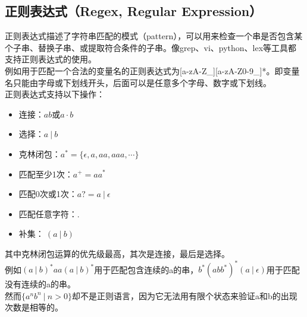 \vspace{0.5cm}

\subsection{正则表达式（Regex, Regular Expression）}

正则表达式描述了字符串匹配的模式（pattern），可以用来检查一个串是否包含某个子串、替换子串、或提取符合条件的子串。像grep、vi、python、lex等工具都支持正则表达式的使用。\\

例如用于匹配一个合法的变量名的正则表达式为[a-zA-Z\_][a-zA-Z0-9\_]*。即变量名只能由字母或下划线开头，后面可以是任意多个字母、数字或下划线。\\

正则表达式支持以下操作：

\begin{itemize}
	\item 连接：$ ab $或$ a \cdot b $
	\item 选择：$ a\ |\ b $
	\item 克林闭包：$ a^* = \{\epsilon, a, aa, aaa, \cdots\} $
	\item 匹配至少1次：$ a^+ = aa^* $
	\item 匹配0次或1次：$ a? = a\ |\ \epsilon $
	\item 匹配任意字符：$ . $
	\item 补集：$ ~(a\ |\ b) $
\end{itemize}

其中克林闭包运算的优先级最高，其次是连接，最后是选择。\\

例如$ (a\ |\ b)^*aa(a\ |\ b)^* $用于匹配包含连续的a的串，$ b^*(abb^*)^*(a\ |\ \epsilon) $用于匹配没有连续的a的串。\\

然而$ \{a^nb^n\ |\ n > 0\} $却不是正则语言，因为它无法用有限个状态来验证a和b的出现次数是相等的。\\

\newpage